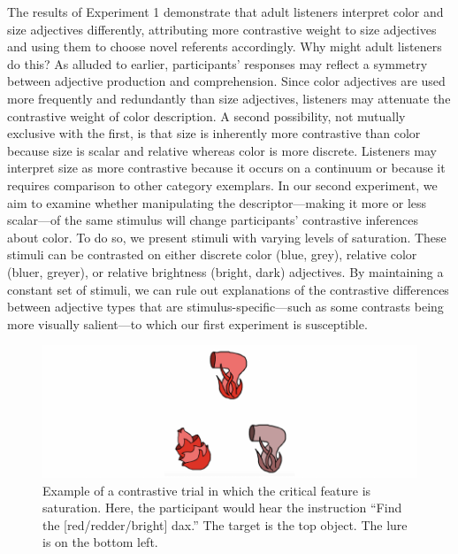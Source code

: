 \documentclass[10pt, letterpaper]{article}
\newenvironment{CodeChunk}{}{}
\begin{document}
The results of Experiment 1 demonstrate that adult listeners interpret
color and size adjectives differently, attributing more contrastive
weight to size adjectives and using them to choose novel referents
accordingly. Why might adult listeners do this? As alluded to earlier,
participants' responses may reflect a symmetry between adjective
production and comprehension. Since color adjectives are used more
frequently and redundantly than size adjectives, listeners may attenuate
the contrastive weight of color description. A second possibility, not
mutually exclusive with the first, is that size is inherently more
contrastive than color because size is scalar and relative whereas color
is more discrete. Listeners may interpret size as more contrastive
because it occurs on a continuum or because it requires comparison to
other category exemplars. In our second experiment, we aim to examine
whether manipulating the descriptor---making it more or less scalar---of
the same stimulus will change participants' contrastive inferences about
color. To do so, we present stimuli with varying levels of saturation.
These stimuli can be contrasted on either discrete color (blue, grey),
relative color (bluer, greyer), or relative brightness (bright, dark)
adjectives. By maintaining a constant set of stimuli, we can rule out
explanations of the contrastive differences between adjective types that
are stimulus-specific---such as some contrasts being more visually
salient---to which our first experiment is susceptible.

\begin{CodeChunk}
\begin{figure}[H]

{\centering \includegraphics{figs/brightdarktrial-1} 

}

\caption[Example of a contrastive trial in which the critical feature is saturation]{Example of a contrastive trial in which the critical feature is saturation. Here, the participant would hear the instruction ``Find the [red/redder/bright] dax.'' The target is the top object. The lure is on the bottom left.}\label{fig:brightdarktrial}
\end{figure}
\end{CodeChunk}
\end{document}
